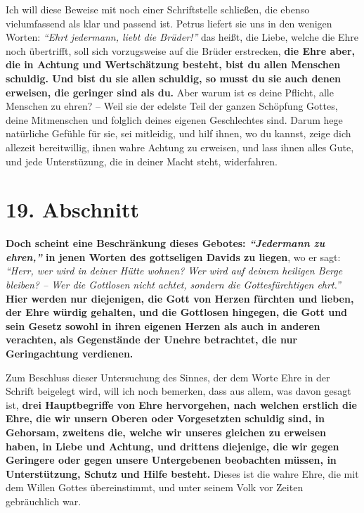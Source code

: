 Ich will diese Beweise mit noch einer Schriftstelle schließen, die ebenso
vielumfassend als klar und passend ist. Petrus liefert sie uns in den
wenigen Worten:
\textit{"`Ehrt jedermann, liebt die Brüder!"'}
das heißt, die Liebe, welche die Ehre noch übertrifft, soll sich vorzugsweise
auf die
Brüder erstrecken, \label{ref:09_18_ehre}
\textbf{die Ehre aber, die in Achtung und Wertschätzung besteht,
bist du allen Menschen schuldig. Und bist du sie allen schuldig, so musst du sie
auch denen erweisen, die geringer sind als du. } Aber warum
ist es deine Pflicht,
alle Menschen zu ehren? -- Weil sie der edelste Teil der ganzen Schöpfung
Gottes, deine Mitmenschen und folglich deines eigenen Geschlechtes sind. Darum
hege natürliche Gefühle für sie, sei mitleidig, und hilf ihnen, wo du kannst,
zeige dich allezeit bereitwillig, ihnen wahre Achtung zu erweisen, und lass
ihnen
alles Gute, und jede Unterstüzung, die in deiner Macht steht, widerfahren.

\section{19. Abschnitt} \label{kap9_ab19}

 \label{ref:09_19_ehre}
\textbf{Doch scheint eine Beschränkung dieses Gebotes:
\textit{"`Jedermann zu ehren,"'} in jenen
Worten des gottseligen Davids zu liegen}, wo er sagt:
\textit{"`Herr, wer wird
in deiner Hütte wohnen? Wer wird auf deinem heiligen Berge bleiben? -- Wer die
Gottlosen nicht achtet, sondern die Gottesfürchtigen ehrt."'}
\textbf{Hier werden nur diejenigen, die Gott von Herzen fürchten und lieben, der
Ehre würdig gehalten, und die Gottlosen
hingegen,
die Gott und sein Gesetz
sowohl in ihren eigenen Herzen als auch in anderen verachten, als Gegenstände
der
Unehre betrachtet, die nur Geringachtung verdienen.}

\medskip

Zum Beschluss dieser Untersuchung des Sinnes, der dem Worte Ehre in der Schrift
beigelegt wird, will ich noch bemerken, dass aus allem, was davon gesagt ist,
\textbf{drei Hauptbegriffe von Ehre hervorgehen, nach welchen erstlich die Ehre,
die wir
unsern Oberen oder Vorgesetzten schuldig sind, in Gehorsam, zweitens die, welche
wir unseres gleichen zu erweisen haben, in Liebe und Achtung, und drittens
diejenige, die wir gegen Geringere oder gegen unsere Untergebenen beobachten
müssen, in Unterstützung, Schutz und Hilfe besteht.} Dieses ist die wahre Ehre,
die mit dem Willen Gottes übereinstimmt, und unter seinem Volk vor Zeiten
gebräuchlich war.

